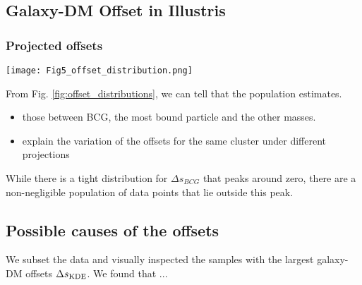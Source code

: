 \subsection{Galaxy-DM Offset in Illustris}
\subsubsection{Projected offsets}
\begin{figure*}
	\begin{center}
	\texttt{[image: Fig5\_offset\_distribution.png]}
	\caption{ 		
		The distribution of different offsets of [TODO] clusters with [TODO]
		projections. The dark blue area indicates the 68\% confidence interval
		while the light blue area shows the 95\% confidence interval. 
		We provide two ways of summarizing the offsets, the {\bf left column} shows
		the offsets when we randomly denote the sign of the offset. The
		direction of the offset in the Illustris simulation without SIDM has no 
		physical meaning.
		The estimates of the offsets on the left are all consistent with 0 within
		the 68\% confidence interval.
		On the {\bf right column}, we plot {\it the same data} after taking the
		absolute magnitude. The estimates from the absolute magnitude of the
		offsets are pushed towards larger values due to the cutoff at zero from
		taking the absolute values. None of the estimates from the
		absolute offsets is consistent with 0 within the 68\% interval.
				\label{fig:offset_distributions}
	}
\end{center}
\end{figure*}

From Fig. \ref{fig:offset_distributions}, we can tell that the population 
estimates. 

\begin{itemize}
\item those between BCG, the most bound particle and the other masses. 
\item explain the variation of the offsets for the same cluster under different 
projections 
\end{itemize}

While there is a tight distribution for $\Delta s_{BCG}$ that peaks around
zero, there are a non-negligible population of data points that lie outside
this peak. 

\subsection{Possible causes of the offsets}
We subset the data and visually inspected the samples with the largest galaxy-DM
offsets $\Delta s_{\rm KDE}$. We found that ...  

